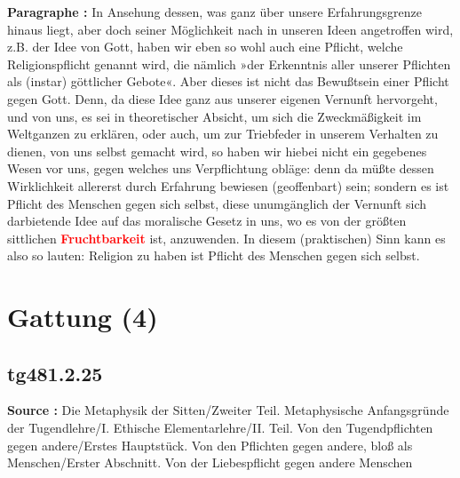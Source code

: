 \documentclass[a4paper,12pt,twoside]{book}
\newcommand{\match}[1]{\textcolor{red}{\textbf{#1}}}
\newcommand{\unnumberedsection}[1]{
	\section*{#1}
	\addcontentsline{toc}{section}{#1}
	\markright{#1}
}
\begin{document}
	\textbf{Paragraphe : }
	In Ansehung dessen, was ganz über unsere Erfahrungsgrenze hinaus liegt, aber doch seiner Möglichkeit nach in unseren Ideen angetroffen wird, z.B. der Idee von Gott, haben wir eben so wohl auch eine Pflicht, welche Religionspflicht genannt wird, die nämlich »der Erkenntnis aller unserer Pflichten als (instar) göttlicher Gebote«. Aber dieses ist nicht das Bewußtsein einer Pflicht gegen Gott. Denn, da diese Idee ganz aus unserer eigenen Vernunft hervorgeht, und von uns, es sei in theoretischer Absicht, um sich die Zweckmäßigkeit im Weltganzen zu erklären, oder auch, um zur Triebfeder in unserem Verhalten zu dienen, von uns selbst gemacht wird, so haben wir hiebei nicht ein gegebenes Wesen vor uns, gegen welches uns Verpflichtung obläge: denn da müßte dessen Wirklichkeit allererst durch Erfahrung bewiesen (geoffenbart) sein; sondern es ist Pflicht des Menschen gegen sich selbst, diese unumgänglich der Vernunft sich darbietende Idee auf das moralische Gesetz in uns, wo es von der größten sittlichen \match{Fruchtbarkeit} ist, anzuwenden. In diesem (praktischen) Sinn kann es also so lauten: Religion zu haben ist Pflicht des Menschen gegen sich selbst. 
	
	\unnumberedsection{Gattung (4)} 
	\subsection*{tg481.2.25} 
	\textbf{Source : }Die Metaphysik der Sitten/Zweiter Teil. Metaphysische Anfangsgründe der Tugendlehre/I. Ethische Elementarlehre/II. Teil. Von den Tugendpflichten gegen andere/Erstes Hauptstück. Von den Pflichten gegen andere, bloß als Menschen/Erster Abschnitt. Von der Liebespflicht gegen andere Menschen\\  
	
\end{document}
